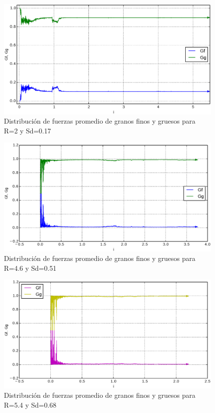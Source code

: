 \begin{figure}[htb]
\centering
\includegraphics[width=\textwidth]{Anexo2//PSD_20}
\caption{Distribuci\'on de fuerzas promedio de granos finos y gruesos para R=2 y Sd=0.17}
\label{fig:PSD20}
\end{figure}

\begin{figure}[htb]
\centering
\includegraphics[width=\textwidth]{Anexo2//PSD_46}
\caption{Distribuci\'on de fuerzas promedio de granos finos y gruesos para R=4.6 y Sd=0.51}
\label{fig:PSD46}
\end{figure}


\begin{figure}[htb]
\centering
\includegraphics[width=\textwidth]{Anexo2//PSD_50}
\caption{Distribuci\'on de fuerzas promedio de granos finos y gruesos para R=5.4 y Sd=0.68}
\label{fig:PSD50}
\end{figure}









